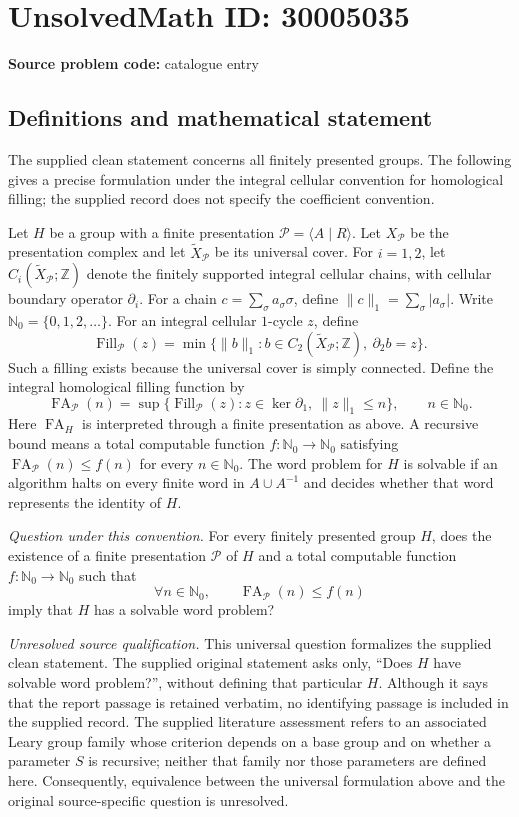\documentclass[11pt]{article}
\newcommand{\N}{\mathbb{N}}
\newcommand{\Z}{\mathbb{Z}}
\begin{document}
\section*{UnsolvedMath ID: 30005035}
\textbf{Source problem code:} catalogue entry
\subsection{Definitions and mathematical statement}
The supplied clean statement concerns all finitely presented groups. The following gives a precise formulation under the integral cellular convention for homological filling; the supplied record does not specify the coefficient convention.

Let \(H\) be a group with a finite presentation \(\mathcal P=\langle A\mid R\rangle\). Let \(X_{\mathcal P}\) be the presentation complex and let \(\widetilde X_{\mathcal P}\) be its universal cover. For \(i=1,2\), let \(C_i(\widetilde X_{\mathcal P};\Z)\) denote the finitely supported integral cellular chains, with cellular boundary operator \(\partial_i\). For a chain \(c=\sum_\sigma a_\sigma\sigma\), define \(\lVert c\rVert_1=\sum_\sigma |a_\sigma|\). Write \(\N_0=\{0,1,2,\ldots\}\). For an integral cellular \(1\)-cycle \(z\), define
\[
\operatorname{Fill}_{\mathcal P}(z)
=\min\bigl\{\lVert b\rVert_1:b\in C_2(\widetilde X_{\mathcal P};\Z),\ \partial_2b=z\bigr\}.
\]
Such a filling exists because the universal cover is simply connected. Define the integral homological filling function by
\[
\operatorname{FA}_{\mathcal P}(n)
=\sup\bigl\{\operatorname{Fill}_{\mathcal P}(z):
 z\in\ker\partial_1,\ \lVert z\rVert_1\le n\bigr\},
\qquad n\in\N_0.
\]
Here \(\operatorname{FA}_H\) is interpreted through a finite presentation as above. A recursive bound means a total computable function \(f:\N_0\to\N_0\) satisfying \(\operatorname{FA}_{\mathcal P}(n)\le f(n)\) for every \(n\in\N_0\). The word problem for \(H\) is solvable if an algorithm halts on every finite word in \(A\cup A^{-1}\) and decides whether that word represents the identity of \(H\).

\emph{Question under this convention.} For every finitely presented group \(H\), does the existence of a finite presentation \(\mathcal P\) of \(H\) and a total computable function \(f:\N_0\to\N_0\) such that
\[
\forall n\in\N_0,\qquad \operatorname{FA}_{\mathcal P}(n)\le f(n)
\]
imply that \(H\) has a solvable word problem?

\emph{Unresolved source qualification.} This universal question formalizes the supplied clean statement. The supplied original statement asks only, ``Does \(H\) have solvable word problem?'', without defining that particular \(H\). Although it says that the report passage is retained verbatim, no identifying passage is included in the supplied record. The supplied literature assessment refers to an associated Leary group family whose criterion depends on a base group and on whether a parameter \(S\) is recursive; neither that family nor those parameters are defined here. Consequently, equivalence between the universal formulation above and the original source-specific question is unresolved.
\end{document}
